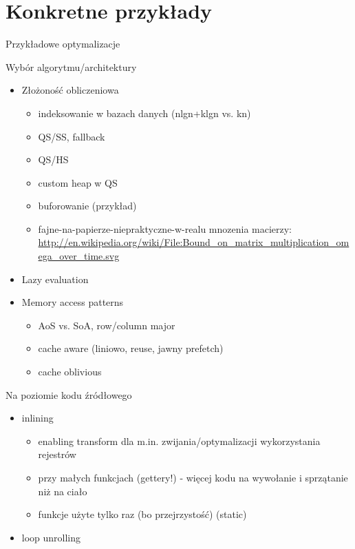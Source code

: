 \section{Konkretne przykłady} %
\begin{frame}{Przykładowe optymalizacje}
	\begin{block}{Wybór algorytmu/architektury}
		\begin{itemize}
			\item Złożoność obliczeniowa
				\begin{itemize}
					\item indeksowanie w bazach danych (nlgn+klgn vs. kn)
					\item QS/SS, fallback
					\item QS/HS
					\item custom heap w QS
					\item buforowanie (przykład)
					\item fajne-na-papierze-niepraktyczne-w-realu mnozenia macierzy: \url{http://en.wikipedia.org/wiki/File:Bound_on_matrix_multiplication_omega_over_time.svg}
				\end{itemize}
			\item Lazy evaluation
			\item Memory access patterns
				\begin{itemize}
					\item AoS vs. SoA, row/column major
					\item cache aware (liniowo, reuse, jawny prefetch)
					\item cache oblivious
				\end{itemize}
		\end{itemize}
	\end{block}
	\begin{block}{Na poziomie kodu źródłowego}
		\begin{itemize}
			\item inlining
				\begin{itemize}
					\item enabling transform dla m.in. zwijania/optymalizacji wykorzystania rejestrów
					\item przy małych funkcjach (gettery!) - więcej kodu na wywołanie i sprzątanie niż na ciało
					\item funkcje użyte tylko raz (bo przejrzystość) (static)
				\end{itemize}
			\item loop unrolling

\end{itemize}
\end{block}
\end{frame}
